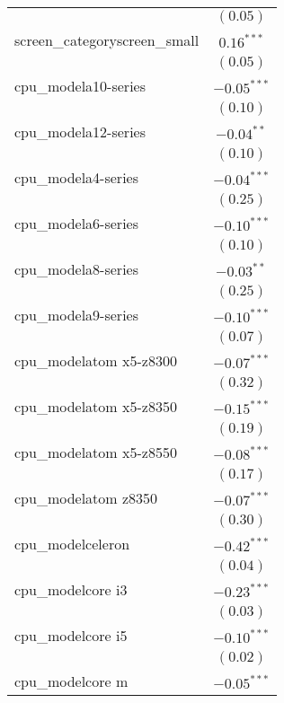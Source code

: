\documentclass[
]{article}
\begin{document}
\begin{table}
\begin{center}
\begin{tabular}{l c}
                              & $(0.05)$      \\
screen\_categoryscreen\_small & $0.16^{***}$  \\
                              & $(0.05)$      \\
cpu\_modela10-series          & $-0.05^{***}$ \\
                              & $(0.10)$      \\
cpu\_modela12-series          & $-0.04^{**}$  \\
                              & $(0.10)$      \\
cpu\_modela4-series           & $-0.04^{***}$ \\
                              & $(0.25)$      \\
cpu\_modela6-series           & $-0.10^{***}$ \\
                              & $(0.10)$      \\
cpu\_modela8-series           & $-0.03^{**}$  \\
                              & $(0.25)$      \\
cpu\_modela9-series           & $-0.10^{***}$ \\
                              & $(0.07)$      \\
cpu\_modelatom x5-z8300       & $-0.07^{***}$ \\
                              & $(0.32)$      \\
cpu\_modelatom x5-z8350       & $-0.15^{***}$ \\
                              & $(0.19)$      \\
cpu\_modelatom x5-z8550       & $-0.08^{***}$ \\
                              & $(0.17)$      \\
cpu\_modelatom z8350          & $-0.07^{***}$ \\
                              & $(0.30)$      \\
cpu\_modelceleron             & $-0.42^{***}$ \\
                              & $(0.04)$      \\
cpu\_modelcore i3             & $-0.23^{***}$ \\
                              & $(0.03)$      \\
cpu\_modelcore i5             & $-0.10^{***}$ \\
                              & $(0.02)$      \\
cpu\_modelcore m              & $-0.05^{***}$ \\

\end{tabular}
\end{center}
\end{table}
\end{document}
